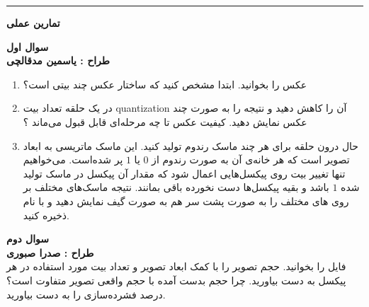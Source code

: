 \documentclass[a4paper]{article}
\begin{document}
\rule[0.1\baselineskip]{\textwidth}{1pt}

\textbf{\huge
تمارین عملی
}

\vspace{0.5cm}
\textbf{\LARGE
	سوال اول
}
\\
\textbf{طراح :‌ یاسمین مدقالچی}
\begin{enumerate}
	\item 
عکس 
را بخوانید. ابتدا مشخص کنید که ساختار عکس چند بیتی است؟
\item
در یک حلقه تعداد بیت quantization آن را کاهش دهید و نتیجه را به صورت چند عکس نمایش دهید. کیفیت عکس تا چه مرحله‌ای قابل قبول می‌ماند ؟
	\item 
حال درون حلقه برای هر
 چند ماسک رندوم تولید کنید. این ماسک ماتریسی به ابعاد تصویر است که هر خانه‌ی آن به صورت رندوم از $ 0 $ یا $ 1 $ پر شده‌است. می‌خواهیم  تنها تغییر بیت
 روی پیکسل‌هایی اعمال شود که مقدار آن پیکسل در ماسک تولید شده $ 1 $ باشد و بقیه پیکسل‌ها دست نخورده باقی بمانند. نتیجه ماسک‌های مختلف بر روی 
های مختلف را به صورت پشت سر هم به صورت گیف نمایش دهید و با نام 
ذخیره کنید.
\end{enumerate}
\newpage
\textbf{\LARGE
سوال دوم
}
\\
\textbf{طراح :‌ صدرا صبوری}
\\
فایل 
 را بخوانید. حجم تصویر را با کمک ابعاد تصویر و تعداد بیت مورد استفاده در هر پیکسل به دست بیاورید. چرا حجم بدست آمده با حجم واقعی تصویر متفاوت است؟ درصد فشرده‌سازی را به دست بیاورید.
\end{document}
